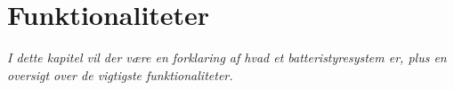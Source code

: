 \chapter{Funktionaliteter}\label{kap:funktionaliteter}

\emph{I dette kapitel vil der være en forklaring af hvad et batteristyresystem er, plus en oversigt over de vigtigste funktionaliteter.}